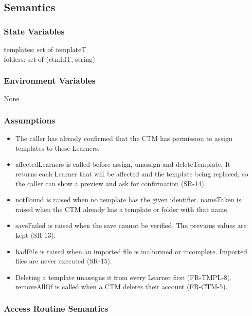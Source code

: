 \documentclass[12pt, titlepage]{article}
\begin{document}
\subsection{Semantics}

\subsubsection{State Variables}

templates: set of templateT \\
folders: set of (ctmIdT, string)

\subsubsection{Environment Variables}

None

\subsubsection{Assumptions}

\begin{itemize}
\item The caller has already confirmed that the CTM has permission to assign
  templates to these Learners.
\item affectedLearners is called before assign, unassign and deleteTemplate. It
  returns each Learner that will be affected and the template being replaced,
  so the caller can show a preview and ask for confirmation (SR-14).
\item notFound is raised when no template has the given identifier. nameTaken is
  raised when the CTM already has a template or folder with that name.
\item saveFailed is raised when the save cannot be verified. The previous values
  are kept (SR-13).
\item badFile is raised when an imported file is malformed or incomplete.
  Imported files are never executed (SR-15).
\item Deleting a template unassigns it from every Learner first (FR-TMPL-8).
  removeAllOf is called when a CTM deletes their account (FR-CTM-5).
\end{itemize}

\subsubsection{Access Routine Semantics}
\end{document}
